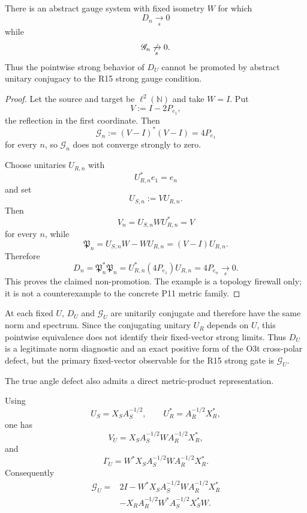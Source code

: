 \begin{proposition}
\label{prop:o3u-moving-countermodel}
There is an abstract gauge system with fixed isometry $W$ for which
\[
 D_n\xrightarrow[s]{}0
\]
while
\[
 \mathscr G_n\not\xrightarrow[s]{}0.
\]
Thus the pointwise strong behavior of $D_U$ cannot be promoted by abstract unitary
conjugacy to the R15 strong gauge condition.
\end{proposition}

\begin{proof}
Let the source and target be $\ell^2(\mathbb N)$ and take $W=I$.  Put
\[
 V:=I-2P_{e_1},
\]
the reflection in the first coordinate.  Then
\[
 \mathscr G_n:=(V-I)^*(V-I)=4P_{e_1}
\]
for every $n$, so $\mathscr G_n$ does not converge strongly to zero.

Choose unitaries $U_{R,n}$ with
\[
 U_{R,n}^*e_1=e_n
\]
and set
\[
 U_{S,n}:=VU_{R,n}.
\]
Then
\[
 V_n=U_{S,n}WU_{R,n}^*=V
\]
for every $n$, while
\[
 \mathfrak P_n
 =U_{S,n}W-WU_{R,n}
 =(V-I)U_{R,n}.
\]
Therefore
\[
 D_n
 =\mathfrak P_n^*\mathfrak P_n
 =U_{R,n}^*(4P_{e_1})U_{R,n}
 =4P_{e_n}
 \xrightarrow[s]{}0.
\]
This proves the claimed non-promotion.  The example is a topology firewall only; it is
not a counterexample to the concrete P11 metric family.
\end{proof}

\begin{remark}
\label{rem:o3u-moving-firewall}
At each fixed $U$, $D_U$ and $\mathscr G_U$ are unitarily conjugate and therefore have
the same norm and spectrum.  Since the conjugating unitary $U_R$ depends on $U$, this
pointwise equivalence does not identify their fixed-vector strong limits.  Thus
$D_U$ is a legitimate norm diagnostic and an exact positive form of the O3t cross-polar
defect, but the primary fixed-vector observable for the R15 strong gate is
$\mathscr G_U$.
\end{remark}

The true angle defect also admits a direct metric-product representation.

\begin{proposition}
\label{prop:o3u-metric-representation}
Using
\[
 U_S=X_SA_S^{-1/2},
 \qquad
 U_R^*=A_R^{-1/2}X_R^*,
\]
one has
\[
 \boxed{
 V_U=X_SA_S^{-1/2}WA_R^{-1/2}X_R^*,
 }
\tag{O3U.11}\label{eq:o3u-V-metric}
\]
and
\[
 \boxed{
 \Gamma_U
 =W^*X_SA_S^{-1/2}WA_R^{-1/2}X_R^*.
 }
\tag{O3U.12}\label{eq:o3u-Gamma-metric}
\]
Consequently
\[
 \boxed{
 \begin{aligned}
 \mathscr G_U
 ={}&2I
 -W^*X_SA_S^{-1/2}WA_R^{-1/2}X_R^*\\
 &-X_RA_R^{-1/2}W^*A_S^{-1/2}X_S^*W.
 \end{aligned}
 }
\tag{O3U.13}\label{eq:o3u-G-metric}
\]
\end{proposition}

